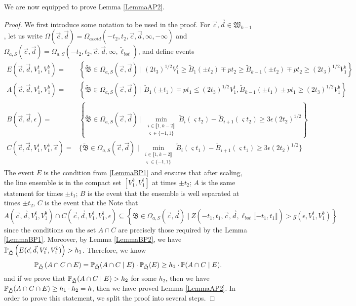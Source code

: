 We are now equipped to prove Lemma \ref{LemmaAP2}.
\begin{proof}
We first introduce some notation to be used in the proof. For $\vec{c}, \vec{d} \in \mathfrak{W}_{k-1}$, let us write $\Omega(\vec{c},\vec{d}) = \Omega_{avoid}(-t_{2}, t_{2}, \vec{c}, \vec{d}, \infty, -\infty)$ and ${\Omega_{a,S}}(\vec{c},\vec{d}) = \Omega_{a,S}(-t_{2}, t_{2}, \vec{c}, \vec{d}, \infty, \tilde{\ell}_{bot})$, and define events
\begin{equation*}
\begin{split}
E(\vec c,\vec d, V_1^t, V_1^b)=&\left\{\tilde{\mathfrak{B}}\in \Omega_{a,S}(\vec c,\vec d)\mid (2t_3)^{1/2} V_1^t \geq \tilde{B}_1(\pm t_2) \mp p t_2 \geq \tilde{B}_{k-1}(\pm t_2) \mp p t_2 \geq (2t_3)^{1/2} V_1^b\right\}\\
A(\vec c,\vec d, V^t_1,V^b_1)=&\left\{\tilde{\mathfrak{B}}\in \Omega_{a,S}(\vec c,\vec d)\mid \tilde{B}_1\left(\pm t_1\right)\mp pt_1\leq\left(2t_3\right)^{1/2}V_1^t,\tilde{B}_{k-1}(\pm t_1)\pm pt_1 \geq \left(2t_3\right)^{1/2}V_1^b\right\}\\
B(\vec c, \vec d, \epsilon)=&\left\{\tilde{\mathfrak{B}}\in \Omega_{a,S}(\vec c,\vec d)\mid\min_{\substack{i\in\llbracket 1,k-2\rrbracket\\\varsigma\in \{-1,1\}}}\tilde{B}_i(\varsigma t_2)-\tilde{B}_{i+1}(\varsigma t_2)\geq 3\epsilon (2t_2)^{1/2}\right\}\\
C(\vec c,\vec d,V_1^t,V_1^b,\vec \epsilon)=&\bigg\{\tilde{\mathfrak{B}}\in \Omega_{a,S}(\vec c,\vec d)\mid\min_{\substack{i\in\llbracket 1,k-2\rrbracket\\\varsigma\in \{-1,1\}}}\tilde{B}_i(\varsigma t_1)-\tilde{B}_{i+1}(\varsigma t_1)\geq 3\epsilon (2t_2)^{1/2}\bigg\}
\end{split}
\end{equation*}
The event $E$ is the condition from \ref{LemmaBP1} and ensures that after scaling, the line ensemble is in the compact set $\left[V_1^b, V_1^t\right]$ at times $\pm t_2$; $A$ is the same statement for times $\pm t_1$; $B$ is the event that the ensemble is well separated at times $\pm t_2$, $C$ is the event that the Note that 
\begin{equation*}
A(\vec c,\vec d, V^t_1,V^b_1)\cap C(\vec c,\vec d,V_1^t,V_1^b,\epsilon)
\subseteq 
\left\{\mathfrak{B}\in\Omega_{a,S}(\vec c,\vec d)\mid Z\left(-t_1,t_1,\vec c,\vec d, \ell_{bot}\llbracket-t_1,t_1\rrbracket\right)>g(\epsilon,V_1^t,V_1^b)\right\}
\end{equation*}
since the conditions on the set $A\cap C$ are precisely those required by the Lemma \ref{LemmaBP1}. Moreover, by Lemma \ref{LemmaBP2},  we have $\mathbb{P}_{\tilde{\mathfrak{Q}}}\left(E(\vec c,\vec d, V_1^t, V_1^b)\right)>h_1$. 
Therefore, we know 
\begin{equation*}
\mathbb{P}_{\tilde{\mathfrak{Q}}}\left(A\cap C\cap E\right)=\mathbb{P}_{\tilde{\mathfrak{Q}}}(A\cap C\mid E)\cdot \mathbb{P}_{\tilde{\mathfrak{Q}}}(E)\geq h_1\cdot \mathbb{P}(A\cap C\mid E).
\end{equation*}
and if we prove that 
$\mathbb{P}_{\tilde{\mathfrak{Q}}}(A\cap C\mid E)>h_2$
for some $h_2$, then we have $\mathbb{P}_{\tilde{\mathfrak{Q}}}(A\cap C\cap E)\geq h_1\cdot h_2=h$, then we have proved Lemma \ref{LemmaAP2}. In order to prove this statement, we split the proof into several steps. 
\end{proof}
